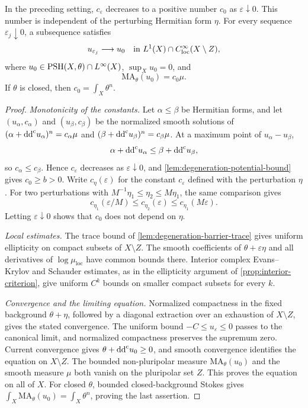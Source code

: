 \begin{theorem}\label{thm:semipositive-smooth-degeneration}
In the preceding setting, $c_\varepsilon$ decreases to a positive number $c_0$ as $\varepsilon\downarrow0$. This number is independent of the perturbing Hermitian form $\eta$. For every sequence $\varepsilon_j\downarrow0$, a subsequence satisfies
\[
 u_{\varepsilon_j}\longrightarrow u_0
       \quad\hbox{in }L^1(X)\cap C^\infty_{\mathrm{loc}}(X\setminus Z),
\]
where $u_0\in\mathrm{PSH}(X,\theta)\cap L^\infty(X)$, $\sup_Xu_0=0$, and
\[
 \mathrm{MA}_\theta(u_0)=c_0\mu.
\]
If $\theta$ is closed, then $c_0=\int_X\theta^n$.
\end{theorem}
\begin{proof}
\emph{Monotonicity of the constants.} Let $\alpha\leq\beta$ be Hermitian forms, and let $(u_\alpha,c_\alpha)$ and $(u_\beta,c_\beta)$ be the normalized smooth solutions of $(\alpha+\mathrm{dd}^{\mathrm{c}} u_\alpha)^n=c_\alpha\mu$ and $(\beta+\mathrm{dd}^{\mathrm{c}} u_\beta)^n=c_\beta\mu$. At a maximum point of $u_\alpha-u_\beta$,
\[
 \alpha+\mathrm{dd}^{\mathrm{c}} u_\alpha\leq\beta+\mathrm{dd}^{\mathrm{c}} u_\beta,
\]
so $c_\alpha\leq c_\beta$. Hence $c_\varepsilon$ decreases as $\varepsilon\downarrow0$, and \cref{lem:degeneration-potential-bound} gives $c_0\geq b>0$. Write $c_\eta(\varepsilon)$ for the constant $c_\varepsilon$ defined with the perturbation $\eta$. For two perturbations with $M^{-1}\eta_1\leq\eta_2\leq M\eta_1$, the same comparison gives
\[
 c_{\eta_1}(\varepsilon/M)
 \leq c_{\eta_2}(\varepsilon)
 \leq c_{\eta_1}(M\varepsilon).
\]
Letting $\varepsilon\downarrow0$ shows that $c_0$ does not depend on $\eta$.

\emph{Local estimates.} The trace bound of \cref{lem:degeneration-barrier-trace} gives uniform ellipticity on compact subsets of $X\setminus Z$. The smooth coefficients of $\theta+\varepsilon\eta$ and all derivatives of $\log\mu_{\mathrm{loc}}$ have common bounds there. Interior complex Evans--Krylov and Schauder estimates, as in the ellipticity argument of \cref{prop:interior-criterion}, give uniform $C^k$ bounds on smaller compact subsets for every $k$.

\emph{Convergence and the limiting equation.} Normalized compactness in the fixed background $\theta+\eta$, followed by a diagonal extraction over an exhaustion of $X\setminus Z$, gives the stated convergence. The uniform bound $-C\leq u_\varepsilon\leq0$ passes to the canonical limit, and normalized compactness preserves the supremum zero. Current convergence gives $\theta+\mathrm{dd}^{\mathrm{c}} u_0\geq0$, and smooth convergence identifies the equation on $X\setminus Z$. The bounded non-pluripolar measure $\mathrm{MA}_\theta(u_0)$ and the smooth measure $\mu$ both vanish on the pluripolar set $Z$. This proves the equation on all of $X$. For closed $\theta$, bounded closed-background Stokes gives $\int_X\mathrm{MA}_\theta(u_0)=\int_X\theta^n$, proving the last assertion.
\end{proof}

